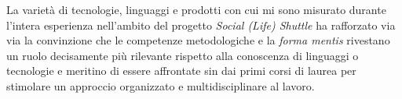 La varietà di tecnologie, linguaggi e prodotti con cui mi sono misurato durante l'intera esperienza nell'ambito del progetto \textit{Social (Life) Shuttle} ha rafforzato via via la convinzione che le competenze metodologiche e la \textit{forma mentis} rivestano un ruolo decisamente più rilevante rispetto alla conoscenza di linguaggi o tecnologie e meritino di essere affrontate sin dai primi corsi di laurea per stimolare un approccio organizzato e multidisciplinare al lavoro.
